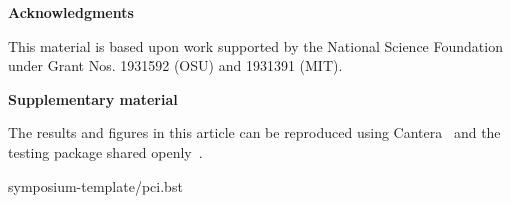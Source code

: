 \documentclass[preprint, 12pt]{elsarticle}
\renewcommand{\section}%
              [1]%
              {%
               \bgroup%
               \flushleft%
               \small\bf%
               \stepcounter{section}%
               \arabic{section}. #1%
               \par%
               \egroup%
              }%
\newcommand{\acknowledgement}%
              [1]%
              {%
               \bgroup%
               \flushleft%
               \small\bf%
               #1%
               \par%
               \egroup%
              }%
\newcommand{\sectionOne}[1]{\section{#1} \addvspace{10pt}}
\newcommand{\symposiumpath}[1]{./}
\newcommand{\bibliographyControl}{
    symposium-template/pci.bst}
    
    }
\begin{document}

\acknowledgement{Acknowledgments} \addvspace{10pt}

This material is based upon work supported by the National Science Foundation under Grant Nos. 1931592 (OSU) and 1931391 (MIT).


\acknowledgement{Supplementary material} \addvspace{10pt}

The results and figures in this article can be reproduced using Cantera~\cite{cantera} and the testing package shared openly~\cite{testing_package}.

 \footnotesize
 \baselineskip 9pt





\newpage

\small
\baselineskip 10pt



\bibliographyControl
\end{document}
